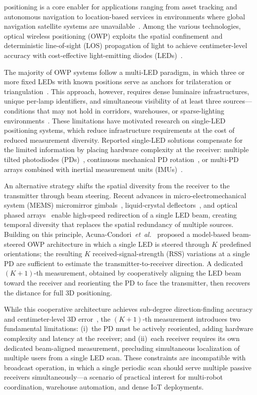 \documentclass[conference]{IEEEtran}
\begin{document}
 positioning is a core enabler for applications ranging from asset tracking and autonomous navigation to location-based services in environments where global navigation satellite systems are unavailable~\cite{Zafari2019, Italiano2025}.
Among the various technologies, optical wireless positioning (OWP) exploits the spatial confinement and deterministic line-of-sight (LOS) propagation of light to achieve centimeter-level accuracy with cost-effective light-emitting diodes (LEDs)~\cite{Wang2024b, Zhu2025}.

The majority of OWP systems follow a multi-LED paradigm, in which three or more fixed LEDs with known positions serve as anchors for trilateration or triangulation~\cite{Plets2019, electronics8111311}.
This approach, however, requires dense luminaire infrastructures, unique per-lamp identifiers, and simultaneous visibility of at least three sources---conditions that may not hold in corridors, warehouses, or sparse-lighting environments~\cite{Cossu2022, Rekkas2023}.
These limitations have motivated research on single-LED positioning systems, which reduce infrastructure requirements at the cost of reduced measurement diversity.
Reported single-LED solutions compensate for the limited information by placing hardware complexity at the receiver: multiple tilted photodiodes (PDs)~\cite{Qin2020, Li2024}, continuous mechanical PD rotation~\cite{Liu2022, Wang2024, Shi2025}, or multi-PD arrays combined with inertial measurement units (IMUs)~\cite{Ma2024}.

An alternative strategy shifts the spatial diversity from the receiver to the transmitter through beam steering.
Recent advances in micro-electromechanical system (MEMS) micromirror gimbals~\cite{Liu:25}, liquid-crystal deflectors~\cite{Feng2019}, and optical phased arrays~\cite{mi13070990} enable high-speed redirection of a single LED beam, creating temporal diversity that replaces the spatial redundancy of multiple sources.
Building on this principle, Acuna-Condori~\textit{et~al.}~\cite{AcunaTCOM2025} proposed a model-based beam-steered OWP architecture in which a single LED is steered through $K$ predefined orientations; the resulting $K$ received-signal-strength (RSS) variations at a single PD are sufficient to estimate the transmitter-to-receiver direction.
A dedicated $(K{+}1)$-th measurement, obtained by cooperatively aligning the LED beam toward the receiver and reorienting the PD to face the transmitter, then recovers the distance for full 3D positioning.

While this cooperative architecture achieves sub-degree direction-finding accuracy and centimeter-level 3D error~\cite{AcunaTCOM2025}, the $(K{+}1)$-th measurement introduces two fundamental limitations:
(i)~the PD must be actively reoriented, adding hardware complexity and latency at the receiver; and
(ii)~each receiver requires its own dedicated beam-aligned measurement, precluding simultaneous localization of multiple users from a single LED scan.
These constraints are incompatible with broadcast operation, in which a single periodic scan should serve multiple passive receivers simultaneously---a scenario of practical interest for multi-robot coordination, warehouse automation, and dense IoT deployments.
\end{document}
